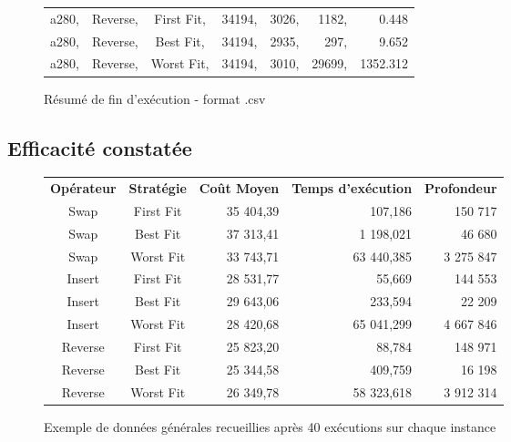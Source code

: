\documentclass[a4paper,10pt]{report}
\begin{document}
\begin{figure}[h]
  \begin{center}
    \begin{tabular}{cccrrrr}
      a280, &Reverse, &First Fit, &34194, &3026, &1182, &0.448\\
      a280, &Reverse, &Best Fit,  &34194, &2935, &297,  &9.652\\
      a280, &Reverse, &Worst Fit, &34194, &3010, &29699,&1352.312\\
    \end{tabular}
  \end{center}
  \label{a280-sample-csv}
  \caption{Résumé de fin d'exécution - format .csv}
\end{figure}


\subsection{Efficacité constatée}

\begin{figure}[h]
  \begin{center}
    \begin{tabular}{ccrrr}
      \textbf{Opérateur}& \textbf{Stratégie}& \textbf{Coût Moyen}& \textbf{Temps d'exécution}& \textbf{Profondeur}\\
      Swap&	First Fit&	35 404,39&	107,186&		150 717\\
      Swap&	Best Fit&	37 313,41&	1 198,021&		46 680\\
      Swap&	Worst Fit&	33 743,71&	63 440,385&		3 275 847\\
      Insert&	First Fit&	28 531,77&	55,669&			144 553\\
      Insert&	Best Fit&	29 643,06&	233,594&		22 209\\
      Insert&	Worst Fit&	28 420,68&	65 041,299&		4 667 846\\
      Reverse&	First Fit&	25 823,20&	88,784&			148 971\\
      Reverse&	Best Fit&	25 344,58&	409,759&		16 198\\
      Reverse&	Worst Fit&	26 349,78&	58 323,618&		3 912 314\\
    \end{tabular}
  \end{center}
  \label{recap-general}
  \caption{Exemple de données générales recueillies après 40 exécutions sur chaque instance}
\end{figure}
\end{document}
